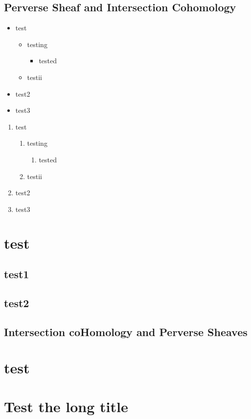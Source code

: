 \documentclass[lang=en,12pt,twoside]{textbook}
\begin{document}
\section{Perverse Sheaf and Intersection Cohomology}

\begin{itemize}
    \item test
    \begin{itemize}
        \item testing
        \begin{itemize}
            \item tested
        \end{itemize}
        \item testii
    \end{itemize}
    \item test2
    \item test3
\end{itemize}

\begin{enumerate}
    \item test
    \begin{enumerate}
        \item testing
        \begin{enumerate}
            \item tested
        \end{enumerate}
        \item testii
    \end{enumerate}
    \item test2
    \item test3
\end{enumerate}

\chapter{test}
\section{test1}
\section{test2}
\section{Intersection coHomology and Perverse Sheaves}
\chapter*{test}


\chapter*{Test the long title}














%
\printbibliography[heading=bibintoc]
\end{document}
